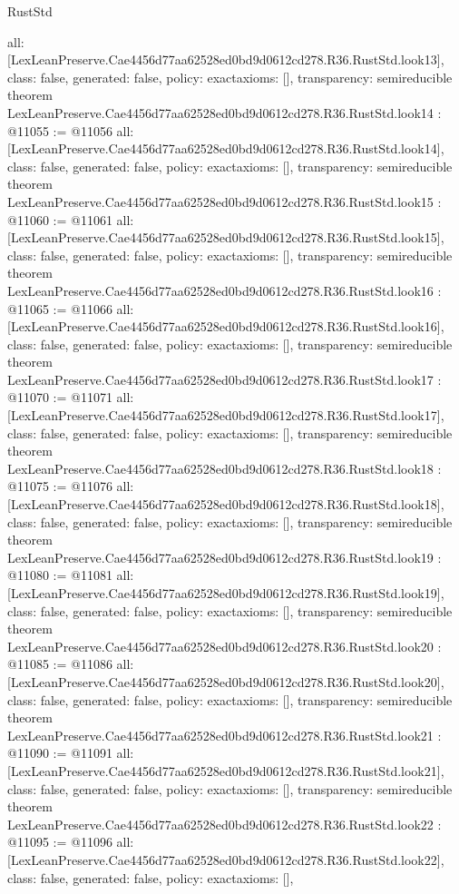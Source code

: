 \begin{lexlean}{RustStd}
\begin{coremodule}
{  all: [LexLeanPreserve.Cae4456d77aa62528ed0bd9d0612cd278.R36.RustStd.look13],
  class: false,
  generated: false,
  policy: exact{axioms: []},
  transparency: semireducible
}
theorem LexLeanPreserve.Cae4456d77aa62528ed0bd9d0612cd278.R36.RustStd.look14 : @11055 := @11056 {
  all: [LexLeanPreserve.Cae4456d77aa62528ed0bd9d0612cd278.R36.RustStd.look14],
  class: false,
  generated: false,
  policy: exact{axioms: []},
  transparency: semireducible
}
theorem LexLeanPreserve.Cae4456d77aa62528ed0bd9d0612cd278.R36.RustStd.look15 : @11060 := @11061 {
  all: [LexLeanPreserve.Cae4456d77aa62528ed0bd9d0612cd278.R36.RustStd.look15],
  class: false,
  generated: false,
  policy: exact{axioms: []},
  transparency: semireducible
}
theorem LexLeanPreserve.Cae4456d77aa62528ed0bd9d0612cd278.R36.RustStd.look16 : @11065 := @11066 {
  all: [LexLeanPreserve.Cae4456d77aa62528ed0bd9d0612cd278.R36.RustStd.look16],
  class: false,
  generated: false,
  policy: exact{axioms: []},
  transparency: semireducible
}
theorem LexLeanPreserve.Cae4456d77aa62528ed0bd9d0612cd278.R36.RustStd.look17 : @11070 := @11071 {
  all: [LexLeanPreserve.Cae4456d77aa62528ed0bd9d0612cd278.R36.RustStd.look17],
  class: false,
  generated: false,
  policy: exact{axioms: []},
  transparency: semireducible
}
theorem LexLeanPreserve.Cae4456d77aa62528ed0bd9d0612cd278.R36.RustStd.look18 : @11075 := @11076 {
  all: [LexLeanPreserve.Cae4456d77aa62528ed0bd9d0612cd278.R36.RustStd.look18],
  class: false,
  generated: false,
  policy: exact{axioms: []},
  transparency: semireducible
}
theorem LexLeanPreserve.Cae4456d77aa62528ed0bd9d0612cd278.R36.RustStd.look19 : @11080 := @11081 {
  all: [LexLeanPreserve.Cae4456d77aa62528ed0bd9d0612cd278.R36.RustStd.look19],
  class: false,
  generated: false,
  policy: exact{axioms: []},
  transparency: semireducible
}
theorem LexLeanPreserve.Cae4456d77aa62528ed0bd9d0612cd278.R36.RustStd.look20 : @11085 := @11086 {
  all: [LexLeanPreserve.Cae4456d77aa62528ed0bd9d0612cd278.R36.RustStd.look20],
  class: false,
  generated: false,
  policy: exact{axioms: []},
  transparency: semireducible
}
theorem LexLeanPreserve.Cae4456d77aa62528ed0bd9d0612cd278.R36.RustStd.look21 : @11090 := @11091 {
  all: [LexLeanPreserve.Cae4456d77aa62528ed0bd9d0612cd278.R36.RustStd.look21],
  class: false,
  generated: false,
  policy: exact{axioms: []},
  transparency: semireducible
}
theorem LexLeanPreserve.Cae4456d77aa62528ed0bd9d0612cd278.R36.RustStd.look22 : @11095 := @11096 {
  all: [LexLeanPreserve.Cae4456d77aa62528ed0bd9d0612cd278.R36.RustStd.look22],
  class: false,
  generated: false,
  policy: exact{axioms: []},
}
\end{coremodule}
\end{lexlean}
